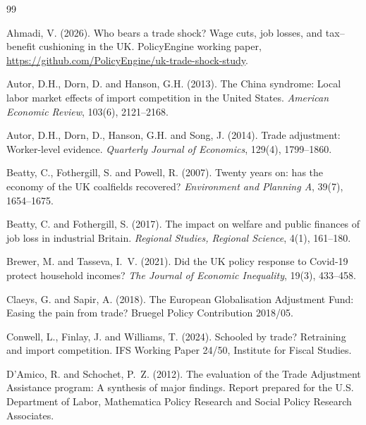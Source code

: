 \begin{thebibliography}{99}

Ahmadi, V. (2026).
\newblock Who bears a trade shock? Wage cuts, job losses, and tax--benefit cushioning in the UK.
\newblock PolicyEngine working paper, \url{https://github.com/PolicyEngine/uk-trade-shock-study}.

Autor, D.H., Dorn, D. and Hanson, G.H. (2013).
\newblock The China syndrome: Local labor market effects of import competition in the United States.
\newblock \emph{American Economic Review}, 103(6), 2121--2168.

Autor, D.H., Dorn, D., Hanson, G.H. and Song, J. (2014).
\newblock Trade adjustment: Worker-level evidence.
\newblock \emph{Quarterly Journal of Economics}, 129(4), 1799--1860.

Beatty, C., Fothergill, S. and Powell, R. (2007).
\newblock Twenty years on: has the economy of the UK coalfields recovered?
\newblock \emph{Environment and Planning A}, 39(7), 1654--1675.

Beatty, C. and Fothergill, S. (2017).
\newblock The impact on welfare and public finances of job loss in industrial Britain.
\newblock \emph{Regional Studies, Regional Science}, 4(1), 161--180.

Brewer, M. and Tasseva, I.~V. (2021).
\newblock Did the UK policy response to Covid-19 protect household incomes?
\newblock \emph{The Journal of Economic Inequality}, 19(3), 433--458.

Claeys, G. and Sapir, A. (2018).
\newblock The European Globalisation Adjustment Fund: Easing the pain from trade?
\newblock Bruegel Policy Contribution 2018/05.

Conwell, L., Finlay, J. and Williams, T. (2024).
\newblock Schooled by trade? Retraining and import competition.
\newblock IFS Working Paper 24/50, Institute for Fiscal Studies.

D'Amico, R. and Schochet, P.~Z. (2012).
\newblock The evaluation of the Trade Adjustment Assistance program: A synthesis of major findings.
\newblock Report prepared for the U.S. Department of Labor, Mathematica Policy Research and Social Policy Research Associates.


\end{thebibliography}
